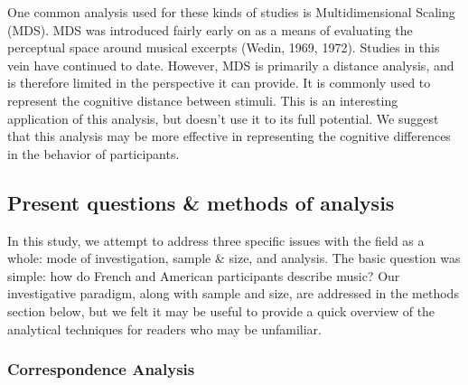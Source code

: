 \documentclass[
  english,
  man,floatsintext]{apa6}
\begin{document}
One common analysis used for these kinds of studies is Multidimensional Scaling (MDS). MDS was introduced fairly early on as a means of evaluating the perceptual space around musical excerpts (Wedin, 1969, 1972). Studies in this vein have continued to date. However, MDS is primarily a distance analysis, and is therefore limited in the perspective it can provide. It is commonly used to represent the cognitive distance between stimuli. This is an interesting application of this analysis, but doesn't use it to its full potential. We suggest that this analysis may be more effective in representing the cognitive differences in the behavior of participants.

\hypertarget{present-questions-methods-of-analysis}{%
\subsection{Present questions \& methods of analysis}\label{present-questions-methods-of-analysis}}

In this study, we attempt to address three specific issues with the field as a whole: mode of investigation, sample \& size, and analysis. The basic question was simple: how do French and American participants describe music? Our investigative paradigm, along with sample and size, are addressed in the methods section below, but we felt it may be useful to provide a quick overview of the analytical techniques for readers who may be unfamiliar.

\hypertarget{correspondence-analysis}{%
\subsubsection{Correspondence Analysis}\label{correspondence-analysis}}
\end{document}
